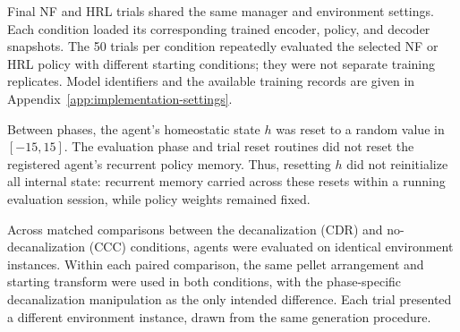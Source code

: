 \documentclass[12pt,fleqn]{article}
\begin{document}
Final NF and HRL trials shared the same manager and environment settings. Each condition loaded its corresponding trained encoder, policy, and decoder snapshots. The 50 trials per condition repeatedly evaluated the selected NF or HRL policy with different starting conditions; they were not separate training replicates. Model identifiers and the available training records are given in Appendix~\ref{app:implementation-settings}.

Between phases, the agent's homeostatic state \(h\) was reset to a random value in \([-15,15]\). The evaluation phase and trial reset routines did not reset the registered agent's recurrent policy memory. Thus, resetting \(h\) did not reinitialize all internal state: recurrent memory carried across these resets within a running evaluation session, while policy weights remained fixed.

Across matched comparisons between the decanalization (CDR) and no-decanalization (CCC) conditions, agents were evaluated on identical environment instances. Within each paired comparison, the same pellet arrangement and starting transform were used in both conditions, with the phase-specific decanalization manipulation as the only intended difference. Each trial presented a different environment instance, drawn from the same generation procedure.
\end{document}
